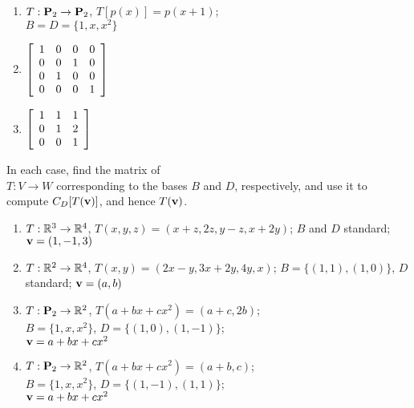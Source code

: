 \begin{multicols}{1}
\begin{ex}
\begin{enumerate}[label={\alph*.}]
\item $T : \textbf{P}_2 \to \textbf{P}_2$, $T[p(x)] = p(x + 1)$; 
\\ $B = D = \{1, x, x^2\}$


\end{enumerate}
\begin{sol}
\begin{enumerate}[label={\alph*.}]
\setcounter{enumi}{1}
\item $\left[ \begin{array}{cccc} 1 & 0 & 0 & 0 \\ 0 & 0 & 1 & 0 \\ 0 & 1 & 0 & 0 \\ 0 & 0 & 0 & 1 \end{array} \right]$


\setcounter{enumi}{3}
\item $\left[ \begin{array}{ccc} 1 & 1 & 1 \\ 0 & 1 & 2 \\ 0 & 0 & 1 \end{array} \right]$


\end{enumerate}
\end{sol}
\end{ex}

\begin{ex}
In each case, find the matrix of \\ $T : V \to W$ corresponding to the bases $B$ and $D$, respectively, and use it to compute $C_{D}[T(\textbf{v})]$, and hence $T(\textbf{v})$.


\begin{enumerate}[label={\alph*.}]
\item $T : \mathbb{R}^3 \to \mathbb{R}^4$, $T(x, y, z) = (x + z, 2z, y - z, x + 2y)$; $B$ and $D$ standard; $\textbf{v} = (1, -1, 3)$


\item $T : \mathbb{R}^2 \to \mathbb{R}^4$, $T(x, y) = (2x - y, 3x + 2y, 4y, x)$; $B = \{(1, 1), (1, 0)\}$, $D$ standard; $\textbf{v} = (a, b)$


\item $T : \textbf{P}_2 \to \mathbb{R}^2$, $T(a + bx + cx^2) = (a + c, 2b)$; \\ $B = \{1, x, x^2\}$, $D = \{(1, 0), (1, -1)\}$; \\ $\textbf{v} = a + bx + cx^2$


\item $T : \textbf{P}_2 \to \mathbb{R}^2$, $T(a + bx + cx^2) = (a + b, c)$; \\ $B = \{1, x, x^2\}$, $D = \{(1, -1), (1, 1)\}$; \\ $\textbf{v} = a + bx + cx^2$



\end{enumerate}
\end{ex}
\end{multicols}
